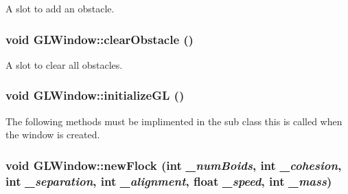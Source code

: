 A slot to add an obstacle. \hypertarget{classGLWindow_a4fce0250c1cb58ebcc22b8764f38aa08}{
\subsubsection[{clearObstacle}]{\setlength{\rightskip}{0pt plus 5cm}void GLWindow::clearObstacle ()}}
\label{classGLWindow_a4fce0250c1cb58ebcc22b8764f38aa08}


A slot to clear all obstacles. \hypertarget{classGLWindow_a39e39761cd7323806917a217cc7caea5}{
\subsubsection[{initializeGL}]{\setlength{\rightskip}{0pt plus 5cm}void GLWindow::initializeGL ()}}
\label{classGLWindow_a39e39761cd7323806917a217cc7caea5}


The following methods must be implimented in the sub class this is called when the window is created. \hypertarget{classGLWindow_aad7322148b1231ff62f918d70c1097ac}{
\subsubsection[{newFlock}]{\setlength{\rightskip}{0pt plus 5cm}void GLWindow::newFlock (int {\em \_\-numBoids}, \/  int {\em \_\-cohesion}, \/  int {\em \_\-separation}, \/  int {\em \_\-alignment}, \/  float {\em \_\-speed}, \/  int {\em \_\-mass})}}
\label{classGLWindow_aad7322148b1231ff62f918d70c1097ac}


